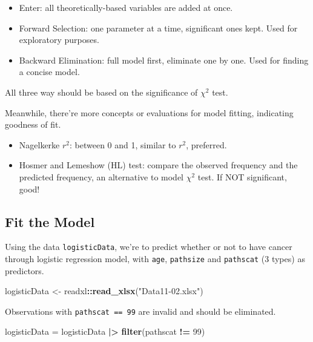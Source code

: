 \documentclass[
]{ctexart}
\newenvironment{Shaded}{\begin{snugshade}}{\end{snugshade}}
\newcommand{\DecValTok}[1]{\textcolor[rgb]{0.00,0.00,0.81}{#1}}
\newcommand{\FunctionTok}[1]{\textcolor[rgb]{0.13,0.29,0.53}{\textbf{#1}}}
\newcommand{\NormalTok}[1]{#1}
\newcommand{\OtherTok}[1]{\textcolor[rgb]{0.56,0.35,0.01}{#1}}
\newcommand{\SpecialCharTok}[1]{\textcolor[rgb]{0.81,0.36,0.00}{\textbf{#1}}}
\newcommand{\StringTok}[1]{\textcolor[rgb]{0.31,0.60,0.02}{#1}}
\providecommand{\tightlist}{%
  \setlength{\itemsep}{0pt}\setlength{\parskip}{0pt}}
\begin{document}
\begin{itemize}
\tightlist
\item
  Enter: all theoretically-based variables are added at once.
\item
  Forward Selection: one parameter at a time, significant ones kept.
  Used for exploratory purposes.
\item
  Backward Elimination: full model first, eliminate one by one. Used for
  finding a concise model.
\end{itemize}

All three way should be based on the significance of \(\chi^2\) test.

Meanwhile, there're more concepts or evaluations for model fitting,
indicating goodness of fit.

\begin{itemize}
\tightlist
\item
  Nagelkerke \(r^2\): between 0 and 1, similar to \(r^2\), preferred.
\item
  Hosmer and Lemeshow (HL) test: compare the observed frequency and the
  predicted frequency, an alternative to model \(\chi^2\) test. If NOT
  significant, good!
\end{itemize}

\hypertarget{fit-the-model-2}{%
\subsection{Fit the Model}\label{fit-the-model-2}}

Using the data \texttt{logisticData}, we're to predict whether or not to
have cancer through logistic regression model, with \texttt{age},
\texttt{pathsize} and \texttt{pathscat} (3 types) as predictors.

\begin{Shaded}
\begin{Highlighting}[]
\NormalTok{logisticData }\OtherTok{\textless{}{-}}\NormalTok{ readxl}\SpecialCharTok{::}\FunctionTok{read\_xlsx}\NormalTok{(}\StringTok{"Data11{-}02.xlsx"}\NormalTok{)}
\end{Highlighting}
\end{Shaded}

Observations with \texttt{pathscat\ ==\ 99} are invalid and should be
eliminated.

\begin{Shaded}
\begin{Highlighting}[]
\NormalTok{logisticData }\OtherTok{=}\NormalTok{ logisticData }\SpecialCharTok{|\textgreater{}} \FunctionTok{filter}\NormalTok{(pathscat }\SpecialCharTok{!=} \DecValTok{99}\NormalTok{)}
\end{Highlighting}
\end{Shaded}
\end{document}

